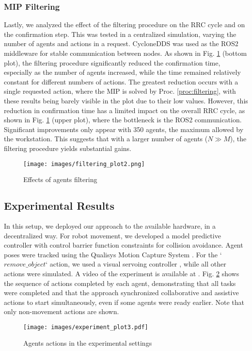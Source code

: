 \subsubsection{MIP Filtering}
Lastly, we analyzed the effect of the filtering procedure on the RRC cycle and on the confirmation step. This was tested in a centralized simulation, varying the number of agents and actions in a request. CycloneDDS \cite{cyclone} was used as the ROS2 middleware for stable communication between nodes.
As shown in Fig. \ref{fig:complexity} (bottom plot), the filtering procedure significantly reduced the confirmation time, especially as the number of agents increased, while the time remained relatively constant for different numbers of actions. The greatest reduction occurs with a single requested action, where the MIP is solved by Proc. \ref{proc:filtering}, with these results being barely visible in the plot due to their low values.
However, this reduction in confirmation time has a limited impact on the overall RRC cycle, as shown in Fig. \ref{fig:complexity} (upper plot), where the bottleneck is the ROS2 communication. Significant improvements only appear with 350 agents, the maximum allowed by the workstation. This suggests that with a larger number of agents ($N \gg M$), the filtering procedure yields substantial gains.
\begin{figure}[t]
    \centering    \texttt{[image: images/filtering\_plot2.png]}
    \caption{Effects of agents filtering}
    \label{fig:complexity}
\end{figure}

\subsection{Experimental Results}
\label{subsec:exp-results}
In this setup, we deployed our approach to the available hardware, in a decentralized way. For robot movement, we developed a model predictive controller \cite{mpc} with control barrier function \cite{cbf_1, cbf_2} constraints for collision avoidance. Agent poses were tracked using the Qualisys Motion Capture System \cite{mocap}. For the `$remove\_object$` action, we used a visual servoing controller \cite{visualservo1,visualservo2}, while all other actions were simulated. A video of the experiment is available at \cite{video}.
Fig. \ref{fig:experimental} shows the sequence of actions completed by each agent, demonstrating that all tasks were completed and that the approach synchronized collaborative and assistive actions to start simultaneously, even if some agents were ready earlier. Note that only non-movement actions are shown.
\begin{figure}[h]
    \centering    
    \texttt{[image: images/experiment\_plot3.pdf]}
    \caption{Agents actions in the experimental settings}
    \label{fig:experimental}
\end{figure}
